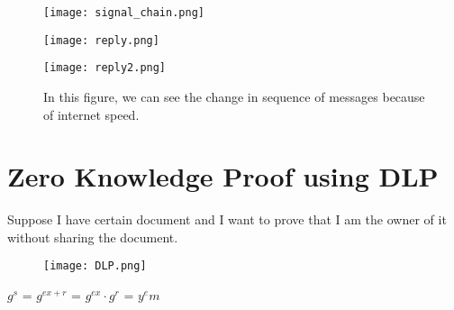 \documentclass[11pt]{article}
\begin{document}
\begin{figure}[t]
  \texttt{[image: signal\_chain.png]}
\end{figure}

\begin{figure}[h]
  \texttt{[image: reply.png]}
\end{figure}

\begin{figure}[h]
  \texttt{[image: reply2.png]}
  \caption{In this figure, we can see the change in sequence of messages because of internet speed.}
\end{figure}

\clearpage %

\section{Zero Knowledge Proof using DLP}
Suppose I have certain document and I want to prove that I am the owner of it without sharing the document. 
\begin{figure}[h]
  \texttt{[image: DLP.png]}
\end{figure}
\begin{center}
    $g^s$ = $g^{ex+r}$ = $g^{ex} \cdot g^r$ = $y^e m$
\end{center}
\end{document}
